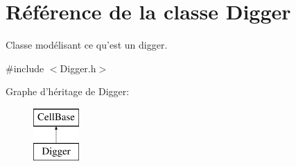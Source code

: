 \hypertarget{class_digger}{\section{Référence de la classe Digger}
\label{class_digger}
}


Classe modélisant ce qu'est un digger.  




{\ttfamily \#include $<$Digger.\-h$>$}

Graphe d'héritage de Digger\-:\begin{figure}[H]
\begin{center}
\leavevmode
\includegraphics[height=2.000000cm]{class_digger}
\end{center}
\end{figure}
